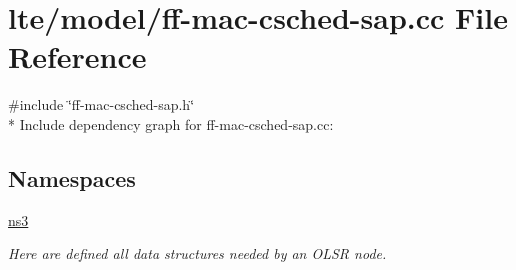 \hypertarget{ff-mac-csched-sap_8cc}{}\section{lte/model/ff-\/mac-\/csched-\/sap.cc File Reference}
\label{ff-mac-csched-sap_8cc}
{\ttfamily \#include \char`\"{}ff-\/mac-\/csched-\/sap.\+h\char`\"{}}\\*
Include dependency graph for ff-\/mac-\/csched-\/sap.cc\+:
\subsection*{Namespaces}
\begin{DoxyCompactItemize}
\item 
 \hyperlink{namespacens3}{ns3}
\begin{DoxyCompactList}\small\item\em Here are defined all data structures needed by an O\+L\+SR node. \end{DoxyCompactList}\end{DoxyCompactItemize}
